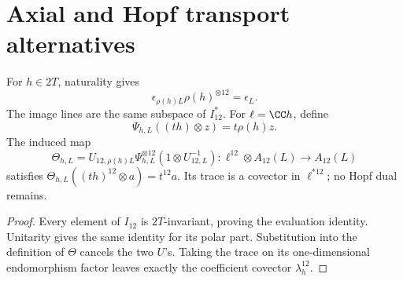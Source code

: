 \documentclass[11pt]{article}
\begin{document}
\section{Axial and Hopf transport alternatives}
\label{p1:app:axial-hopf-transport-alternatives}

\begin{proposition}
\label{p1:prop:axial-invariant-transport}
For \(h\in2T\), naturality gives
\[
 \epsilon_{\rho(h)L}\rho(h)^{\otimes12}=\epsilon_L.
\]
The image lines are the same subspace of \(I_{12}^*\).
For \(\ell=\CC h\), define
\[
 \Psi_{h,L}((th)\otimes z)=t\rho(h)z.
\]  The induced map
\[
 \Theta_{h,L}=U_{12,\rho(h)L}\Psi_{h,L}^{\otimes12}
                 (1\otimes U_{12,L}^{-1}):
 \ell^{12}\otimes A_{12}(L)\longrightarrow A_{12}(L)
\]
satisfies
\(\Theta_{h,L}((th)^{12}\otimes a)=t^{12}a\).
Its trace is a covector in \(\ell^{*12}\); no Hopf dual remains.
\end{proposition}
\begin{proof}
Every element of \(I_{12}\) is \(2T\)-invariant, proving the evaluation
identity.  Unitarity gives the same identity for its polar part.
Substitution into the definition of \(\Theta\) cancels the two \(U\)'s.
Taking the trace on its one-dimensional endomorphism factor leaves
exactly the coefficient covector \(\lambda_h^{12}\).
\end{proof}
\end{document}
